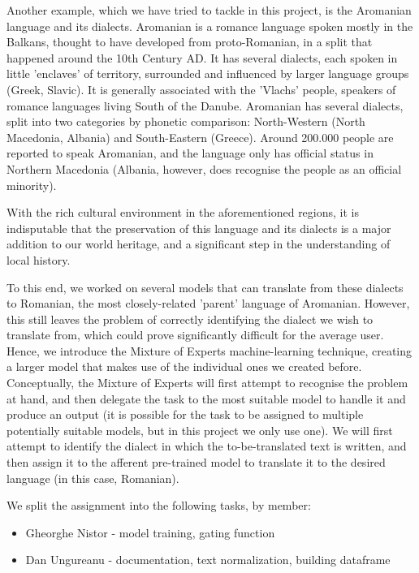 \documentclass[11pt]{article}
\begin{document}
Another example, which we have tried to tackle in this project, is the Aromanian language and its dialects. Aromanian is a romance language spoken mostly in the Balkans, thought to have developed from proto-Romanian, in a split that happened around the 10th Century AD. It has several dialects, each spoken in little 'enclaves' of territory, surrounded and influenced by larger language groups (Greek, Slavic). It is generally associated with the 'Vlachs' people, speakers of romance languages living South of the Danube. Aromanian has several dialects, split into two categories by phonetic comparison: North-Western (North Macedonia, Albania) and South-Eastern (Greece). Around 200.000 people are reported to speak Aromanian, and the language only has official status in Northern Macedonia (Albania, however, does recognise the people as an official minority).

With the rich cultural environment in the aforementioned regions, it is indisputable that the preservation of this language and its dialects is a major addition to our world heritage, and a significant step in the understanding of local history. 

To this end, we worked on several models that can translate from these dialects to Romanian, the most closely-related 'parent' language of Aromanian. However, this still leaves the problem of correctly identifying the dialect we wish to translate from, which could prove significantly difficult for the average user. Hence, we introduce the Mixture of Experts machine-learning technique, creating a larger model that makes use of the individual ones we created before. Conceptually, the Mixture of Experts will first attempt to recognise the problem at hand, and then delegate the task to the most suitable model to handle it and produce an output (it is possible for the task to be assigned to multiple potentially suitable models, but in this project we only use one). We will first attempt to identify the dialect in which the to-be-translated text is written, and then assign it to the afferent pre-trained model to translate it to the desired language (in this case, Romanian).

We split the assignment into the following tasks, by member:
\begin{itemize}
	\item Gheorghe Nistor - model training, gating function
	\item Dan Ungureanu - documentation, text normalization, building dataframe

\end{itemize}
\end{document}
